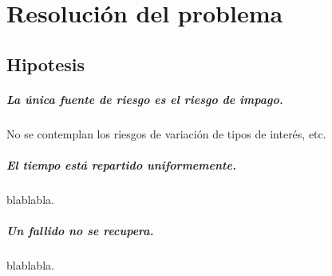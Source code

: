 
%
%
%
%
%
%
%
%

\chapter{Resoluci\'on del problema}
\label{sec:resolution}


\section{Hipotesis}

\paragraph{La \'unica fuente de riesgo es el riesgo de impago.}
No se contemplan los riesgos de variaci\'on de tipos de inter\'es, etc.

\paragraph{El tiempo est\'a repartido uniformemente.}
blablabla.

\paragraph{Un fallido no se recupera.}
blablabla.

